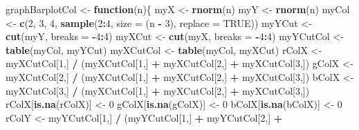 \documentclass[]{book}
\newenvironment{Shaded}{\begin{snugshade}}{\end{snugshade}}
\newcommand{\KeywordTok}[1]{\textcolor[rgb]{0.13,0.29,0.53}{\textbf{#1}}}
\newcommand{\DataTypeTok}[1]{\textcolor[rgb]{0.13,0.29,0.53}{#1}}
\newcommand{\DecValTok}[1]{\textcolor[rgb]{0.00,0.00,0.81}{#1}}
\newcommand{\StringTok}[1]{\textcolor[rgb]{0.31,0.60,0.02}{#1}}
\newcommand{\OtherTok}[1]{\textcolor[rgb]{0.56,0.35,0.01}{#1}}
\newcommand{\ControlFlowTok}[1]{\textcolor[rgb]{0.13,0.29,0.53}{\textbf{#1}}}
\newcommand{\OperatorTok}[1]{\textcolor[rgb]{0.81,0.36,0.00}{\textbf{#1}}}
\newcommand{\NormalTok}[1]{#1}
\theoremstyle{definition}
\theoremstyle{definition}
\theoremstyle{definition}
\theoremstyle{remark}
\begin{document}
\begin{Shaded}
\begin{Highlighting}[]
\NormalTok{graphBarplotCol <-}\StringTok{ }\ControlFlowTok{function}\NormalTok{(n)\{}
\NormalTok{  myX <-}\StringTok{ }\KeywordTok{rnorm}\NormalTok{(n)}
\NormalTok{  myY <-}\StringTok{ }\KeywordTok{rnorm}\NormalTok{(n)}
\NormalTok{  myCol <-}\StringTok{ }\KeywordTok{c}\NormalTok{(}\DecValTok{2}\NormalTok{, }\DecValTok{3}\NormalTok{, }\DecValTok{4}\NormalTok{, }\KeywordTok{sample}\NormalTok{(}\DecValTok{2}\OperatorTok{:}\DecValTok{4}\NormalTok{, }\DataTypeTok{size =}\NormalTok{ (n }\OperatorTok{-}\StringTok{ }\DecValTok{3}\NormalTok{), }\DataTypeTok{replace =} \OtherTok{TRUE}\NormalTok{))}
\NormalTok{  myYCut <-}\StringTok{ }\KeywordTok{cut}\NormalTok{(myY, }\DataTypeTok{breaks =} \OperatorTok{-}\DecValTok{4}\OperatorTok{:}\DecValTok{4}\NormalTok{)}
\NormalTok{  myXCut <-}\StringTok{ }\KeywordTok{cut}\NormalTok{(myX, }\DataTypeTok{breaks =} \OperatorTok{-}\DecValTok{4}\OperatorTok{:}\DecValTok{4}\NormalTok{)}
\NormalTok{  myYCutCol <-}\StringTok{ }\KeywordTok{table}\NormalTok{(myCol, myYCut)}
\NormalTok{  myXCutCol <-}\StringTok{ }\KeywordTok{table}\NormalTok{(myCol, myXCut)}
\NormalTok{  rColX <-}\StringTok{ }\NormalTok{myXCutCol[}\DecValTok{1}\NormalTok{,] }\OperatorTok{/}\StringTok{ }\NormalTok{(myXCutCol[}\DecValTok{1}\NormalTok{,] }\OperatorTok{+}\StringTok{ }\NormalTok{myXCutCol[}\DecValTok{2}\NormalTok{,] }\OperatorTok{+}\StringTok{ }
\StringTok{    }\NormalTok{myXCutCol[}\DecValTok{3}\NormalTok{,])}
\NormalTok{  gColX <-}\StringTok{ }\NormalTok{myXCutCol[}\DecValTok{2}\NormalTok{,] }\OperatorTok{/}\StringTok{ }\NormalTok{(myXCutCol[}\DecValTok{1}\NormalTok{,] }\OperatorTok{+}\StringTok{ }\NormalTok{myXCutCol[}\DecValTok{2}\NormalTok{,] }\OperatorTok{+}\StringTok{ }
\StringTok{    }\NormalTok{myXCutCol[}\DecValTok{3}\NormalTok{,])}
\NormalTok{  bColX <-}\StringTok{ }\NormalTok{myXCutCol[}\DecValTok{3}\NormalTok{,] }\OperatorTok{/}\StringTok{ }\NormalTok{(myXCutCol[}\DecValTok{1}\NormalTok{,] }\OperatorTok{+}\StringTok{ }\NormalTok{myXCutCol[}\DecValTok{2}\NormalTok{,] }\OperatorTok{+}\StringTok{ }
\StringTok{    }\NormalTok{myXCutCol[}\DecValTok{3}\NormalTok{,])}
\NormalTok{  rColX[}\KeywordTok{is.na}\NormalTok{(rColX)] <-}\StringTok{ }\DecValTok{0}
\NormalTok{  gColX[}\KeywordTok{is.na}\NormalTok{(gColX)] <-}\StringTok{ }\DecValTok{0}
\NormalTok{  bColX[}\KeywordTok{is.na}\NormalTok{(bColX)] <-}\StringTok{ }\DecValTok{0}
\NormalTok{  rColY <-}\StringTok{ }\NormalTok{myYCutCol[}\DecValTok{1}\NormalTok{,] }\OperatorTok{/}\StringTok{ }\NormalTok{(myYCutCol[}\DecValTok{1}\NormalTok{,] }\OperatorTok{+}\StringTok{ }\NormalTok{myYCutCol[}\DecValTok{2}\NormalTok{,] }\OperatorTok{+}\StringTok{ }

\end{Highlighting}
\end{Shaded}
\end{document}

